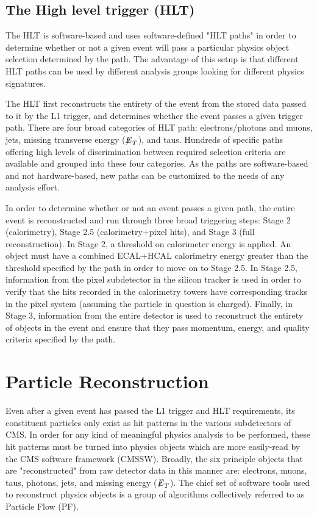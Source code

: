\subsection{The High level trigger (HLT)}

The HLT is software-based and uses software-defined "HLT paths" in order to determine whether or not a given event will pass a particular physics object selection determined by the path. The advantage of this setup is that different HLT paths can be used by different analysis groups looking for different physics signatures.

The HLT first reconstructs the entirety of the event from the stored data passed to it by the L1 trigger, and determines whether the event passes a given trigger path. There are four broad categories of HLT path: electrons/photons and muons, jets, missing transverse energy (${\not\mathrel{E}}_T$), and taus. Hundreds of specific paths offering high levels of discrimination between required selection criteria are available and grouped into these four categories. As the paths are software-based and not hardware-based, new paths can be customized to the needs of any analysis effort.

In order to determine whether or not an event passes a given path, the entire event is reconstructed and run through three broad triggering steps: Stage 2 (calorimetry), Stage 2.5 (calorimetry+pixel hits), and Stage 3 (full reconstruction). In Stage 2, a threshold on calorimeter energy is applied. An object must have a combined ECAL+HCAL calorimetry energy greater than the threshold specified by the path in order to move on to Stage 2.5. In Stage 2.5, information from the pixel subdetector in the silicon tracker is used in order to verify that the hits recorded in the calorimetry towers have corresponding tracks in the pixel system (assuming the particle in question is charged). Finally, in Stage 3, information from the entire detector is used to reconstruct the entirety of objects in the event and ensure that they pass momentum, energy, and quality criteria specified by the path. 



\section{Particle Reconstruction}

Even after a given event has passed the L1 trigger and HLT requirements, its constituent particles only exist as hit patterns in the various subdetectors of CMS. In order for any kind of meaningful physics analysis to be performed, these hit patterns must be turned into physics objects which are more easily-read by the CMS software framework (CMSSW). Broadly, the six principle objects that are "reconstructed" from raw detector data in this manner are: electrons, muons, taus, photons, jets, and missing energy (${\not\mathrel{E}}_T$). The chief set of software tools used to reconstruct physics objects is a group of algorithms collectively referred to as Particle Flow (PF).

